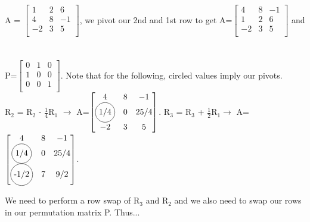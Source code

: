 \documentclass[12pt]{article}
\newcommand*\circled[1]{\tikz[baseline=(char.base)]{
            \node[shape=circle,draw,inner sep=2pt] (char) {#1};}}
\begin{document}
\begin{enumerate}
A = $\begin{bmatrix}
   1 & 2 & 6 \\
   4 & 8 & -1 \\
   -2 & 3 & 5 \\
\end{bmatrix}$, we pivot our 2nd and 1st row to get A=$\begin{bmatrix}
   4 & 8 & -1 \\
   1 & 2 & 6 \\
   -2 & 3 & 5 \\
\end{bmatrix}$ and \\ \\ \\
P=$\begin{bmatrix}
   0 & 1 & 0\\
   1 & 0 & 0 \\
   0 & 0 & 1 \\
\end{bmatrix}$. Note that for the following, circled values imply our pivots.\\R$_2$ = R$_2$ - $\frac{1}{4}$R$_1$ $\rightarrow$ A=$\begin{bmatrix}
   4 & 8 & -1 \\
   \circled{1/4} & 0 & 25/4 \\
   -2 & 3 & 5 \\
\end{bmatrix}$. 
R$_3$ = R$_3$ + $\frac{1}{2}$R$_1 \rightarrow$ A= $\begin{bmatrix}
   4 & 8 & -1 \\
   \circled{1/4} & 0 & 25/4 \\
   \circled{-1/2} & 7 & 9/2 \\
\end{bmatrix}$.
\pagebreak

We need to perform a row swap of R$_3$ and R$_2$ and we also need to swap our rows in our permutation matrix P. Thus... \\ \\
 \\


\end{enumerate}
\end{document}
